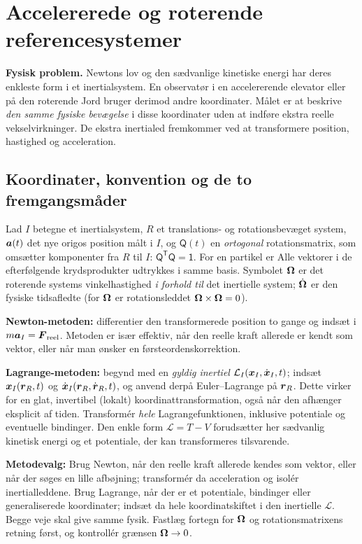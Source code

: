 \clearpage\section{Accelererede og roterende referencesystemer}\label{sec:roterende}
\textbf{Fysisk problem.} Newtons lov og den sædvanlige kinetiske energi har deres enkleste form i et inertialsystem. En observatør i en accelererende elevator eller på den roterende Jord bruger derimod andre koordinater. Målet er at beskrive \emph{den samme fysiske bevægelse} i disse koordinater uden at indføre ekstra reelle vekselvirkninger. De ekstra inertialed fremkommer ved at transformere position, hastighed og acceleration.

\subsection{Koordinater, konvention og de to fremgangsmåder}
Lad $I$ betegne et inertialsystem, $R$ et translations- og rotationsbevæget system, $\boldsymbol{a}(t)$ det nye origos position målt i $I$, og $\mathsf Q(t)$ en \emph{ortogonal} rotationsmatrix, som omsætter komponenter fra $R$ til $I$: $\mathsf Q^{\mathsf T}\mathsf Q=\mathsf 1$. For en partikel er
Alle vektorer i de efterfølgende krydsprodukter udtrykkes i samme basis. Symbolet $\boldsymbol{\Omega}$ er det roterende systems vinkelhastighed \emph{i forhold til} det inertielle system; $\dot{\boldsymbol{\Omega}}$ er den fysiske tidsafledte (for $\boldsymbol{\Omega}$ er rotationsleddet $\boldsymbol{\Omega}\times\boldsymbol{\Omega}=0$).

\textbf{Newton-metoden:} differentier den transformerede position to gange og indsæt i $m\boldsymbol{a}_I=\boldsymbol{F}_{\rm reel}$. Metoden er især effektiv, når den reelle kraft allerede er kendt som vektor, eller når man ønsker en førsteordenskorrektion.

\textbf{Lagrange-metoden:} begynd med en \emph{gyldig inertiel} $\mathcal L_I(\boldsymbol{x}_I,\dot{\boldsymbol{x}}_I,t)$; indsæt $\boldsymbol{x}_I(\boldsymbol{r}_R,t)$ og $\dot{\boldsymbol{x}}_I(\boldsymbol{r}_R,\dot{\boldsymbol{r}}_R,t)$, og anvend derpå Euler--Lagrange på $\boldsymbol{r}_R$. Dette virker for en glat, invertibel (lokalt) koordinattransformation, også når den afhænger eksplicit af tiden. Transformér \emph{hele} Lagrangefunktionen, inklusive potentiale og eventuelle bindinger. Den enkle form $\mathcal L=T-V$ forudsætter her sædvanlig kinetisk energi og et potentiale, der kan transformeres tilsvarende.

\begin{method}\textbf{Metodevalg:} Brug Newton, når den reelle kraft allerede kendes som vektor, eller når der søges en lille afbøjning; transformér da acceleration og isolér inertialleddene. Brug Lagrange, når der er et potentiale, bindinger eller generaliserede koordinater; indsæt da hele koordinatskiftet i den inertielle $\mathcal L$. Begge veje skal give samme fysik. Fastlæg fortegn for $\boldsymbol{\Omega}$ og rotationsmatrixens retning først, og kontrollér grænsen $\boldsymbol{\Omega}\to0$.\end{method}

